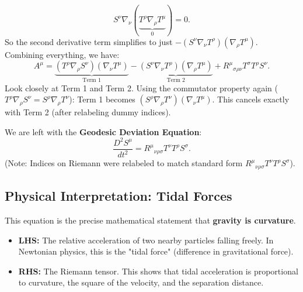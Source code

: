 \documentclass[11pt, a4paper]{report}
\begin{document}
\begin{equation}
S^\nu \nabla_\nu (\underbrace{T^\rho \nabla_\rho T^\mu}_{0}) = 0.
\end{equation}
So the second derivative term simplifies to just \(- (S^\nu \nabla_\nu T^\rho) (\nabla_\rho T^\mu)\).
Combining everything, we have:
\begin{equation}
A^\mu = \underbrace{(T^\rho \nabla_\rho S^\nu)(\nabla_\nu T^\mu)}_{\text{Term 1}} - \underbrace{(S^\nu \nabla_\nu T^\rho)(\nabla_\rho T^\mu)}_{\text{Term 2}} + {R^\mu}_{\sigma\rho\nu} T^\sigma T^\rho S^\nu.
\end{equation}
Look closely at Term 1 and Term 2.
Using the commutator property again (\(T^\rho \nabla_\rho S^\nu = S^\rho \nabla_\rho T^\nu\)):
Term 1 becomes \((S^\rho \nabla_\rho T^\nu)(\nabla_\nu T^\mu)\).
This cancels exactly with Term 2 (after relabeling dummy indices).

We are left with the \textbf{Geodesic Deviation Equation}:
\begin{equation}
\label{eq:geodesic_deviation}
\frac{D^2 S^\mu}{dt^2} = {R^\mu}_{\nu\rho\sigma} T^\nu T^\rho S^\sigma.
\end{equation}
(Note: Indices on Riemann were relabeled to match standard form \({R^\mu}_{\nu\rho\sigma} T^\nu T^\rho S^\sigma\)).

\subsection*{Physical Interpretation: Tidal Forces}
This equation is the precise mathematical statement that \textbf{gravity is curvature}.
\begin{itemize}
    \item \textbf{LHS:} The relative acceleration of two nearby particles falling freely. In Newtonian physics, this is the "tidal force" (difference in gravitational force).
    \item \textbf{RHS:} The Riemann tensor. This shows that tidal acceleration is proportional to curvature, the square of the velocity, and the separation distance.
\end{itemize}
\end{document}
